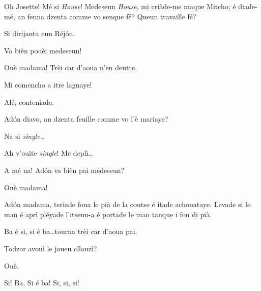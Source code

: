 \begin{drama}
\MedMitchospeaks Oh Josette! Mé si \textit{House}! Medeseun \textit{House}, mi criàde-me maque Mitcho; é diade-mé, an fenna dzenta comme vo senque fé? Queun travaille fé?

\Feliespeaks Si dirijanta eun Réj\'on.

\Gerominespeaks{} Va bièn pouèi medeseun!

\MedMitchospeaks Ouè madama! Trèi car d'aoua n'en deutte.

\Gerominespeaks Mi comencho a itre lagnaye!

\MedMitchospeaks Alé, conteniade.


\MedMitchospeaks{} Ad\'on diavo, an dzenta feuille com\-me vo l'è mariaye?

\Feliespeaks Na si \textit{single}\ldots

\MedMitchospeaks Ah v'ouite \textit{single}! Me deplì\ldots

\Gerominespeaks A mé na! Ad\'on va bièn pai medeseun?

\MedMitchospeaks Ouè madama! 


\MedMitchospeaks Ad\'on madama, teriade foua le pià de la coutse é itade achouataye. Levade si le man é aprì pléyade l'itseun-a é portade le man tanque i fon di pià.


\MedMitchospeaks Ba é si, si é ba\ldots tourna trèi car d'aoua pai.

\Gerominespeaks Todzor avouì le joueu cllouzì?

\MedMitchospeaks Ouè.


\Casimirspeaks{} Si! Ba. Si é ba! Si, si, si!



\end{drama}
